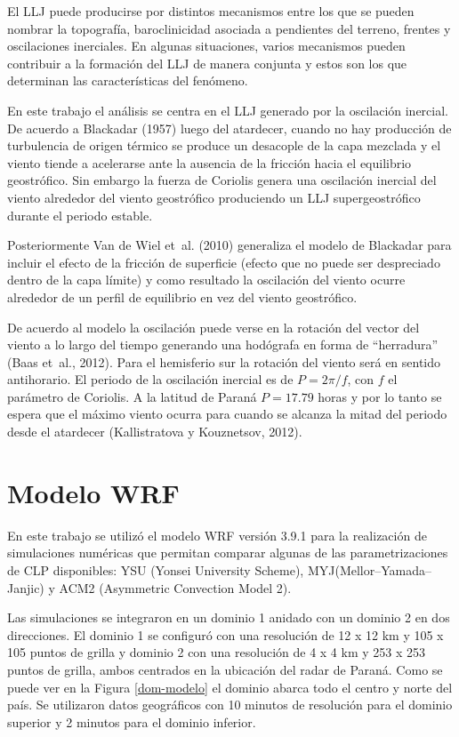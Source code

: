 \documentclass[12pt,spanish,oneside, a4paper]{book}
\begin{document}
El LLJ puede producirse por distintos mecanismos entre los que se pueden
nombrar la topografía, baroclinicidad asociada a pendientes del terreno,
frentes y oscilaciones inerciales. En algunas situaciones, varios
mecanismos pueden contribuir a la formación del LLJ de manera conjunta y
estos son los que determinan las características del fenómeno.

En este trabajo el análisis se centra en el LLJ generado por la
oscilación inercial. De acuerdo a Blackadar (1957) luego del atardecer,
cuando no hay producción de turbulencia de origen térmico se produce un
desacople de la capa mezclada y el viento tiende a acelerarse ante la
ausencia de la fricción hacia el equilibrio geostrófico. Sin embargo la
fuerza de Coriolis genera una oscilación inercial del viento alrededor
del viento geostrófico produciendo un LLJ supergeostrófico durante el
periodo estable.

Posteriormente Van de Wiel et~al. (2010) generaliza el modelo de
Blackadar para incluir el efecto de la fricción de superficie (efecto
que no puede ser despreciado dentro de la capa límite) y como resultado
la oscilación del viento ocurre alrededor de un perfil de equilibrio en
vez del viento geostrófico.

De acuerdo al modelo la oscilación puede verse en la rotación del vector
del viento a lo largo del tiempo generando una hodógrafa en forma de
``herradura'' (Baas et~al., 2012). Para el hemisferio sur la rotación
del viento será en sentido antihorario. El periodo de la oscilación
inercial es de \(P = 2\pi/f\), con \(f\) el parámetro de Coriolis. A la
latitud de Paraná \(P = 17.79\) horas y por lo tanto se espera que el
máximo viento ocurra para cuando se alcanza la mitad del periodo desde
el atardecer (Kallistratova y Kouznetsov, 2012).

\section{Modelo WRF}\label{modelo-wrf}

En este trabajo se utilizó el modelo WRF versión 3.9.1 para la
realización de simulaciones numéricas que permitan comparar algunas de
las parametrizaciones de CLP disponibles: YSU (Yonsei University
Scheme), MYJ(Mellor--Yamada--Janjic) y ACM2 (Asymmetric Convection Model
2).

Las simulaciones se integraron en un dominio 1 anidado con un dominio 2
en dos direcciones. El dominio 1 se configuró con una resolución de 12 x
12 km y 105 x 105 puntos de grilla y dominio 2 con una resolución de 4 x
4 km y 253 x 253 puntos de grilla, ambos centrados en la ubicación del
radar de Paraná. Como se puede ver en la Figura \ref{dom-modelo} el
dominio abarca todo el centro y norte del país. Se utilizaron datos
geográficos con 10 minutos de resolución para el dominio superior y 2
minutos para el dominio inferior.
\end{document}
